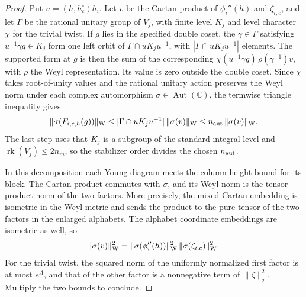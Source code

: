 \begin{proof}
Put $u=(h,h^\circ_c)h_i$. Let $v$ be the Cartan product of $\phi_i''(h)$ and $\zeta_{i,c}$, and let $\Gamma$ be the rational unitary group of $V_j$, with finite level $K_j$ and level character $\chi$ for the trivial twist. If $g$ lies in the specified double coset, the $\gamma\in\Gamma$ satisfying $u^{-1}\gamma g\in K_j$ form one left orbit of $\Gamma\cap u K_j u^{-1}$, with $|\Gamma\cap uK_j u^{-1}|$ elements. The supported form at $g$ is then the sum of the corresponding $\chi(u^{-1}\gamma g)\,\rho(\gamma^{-1})v$, with $\rho$ the Weyl representation. Its value is zero outside the double coset. Since $\chi$ takes root-of-unity values and the rational unitary action preserves the Weyl norm under each complex automorphism $\sigma\in\operatorname{Aut}(\mathbb C)$, the termwise triangle inequality gives
\[
 \|\sigma(F_{i,c,h}(g))\|_{\rm W}
 \le |\Gamma\cap uK_j u^{-1}|\,\|\sigma(v)\|_{\rm W}
 \le n_{\rm aut}\,\|\sigma(v)\|_{\rm W}.
\]
The last step uses that $K_j$ is a subgroup of the standard integral level and $\operatorname{rk}(V_j)\le2n_m$, so the stabilizer order divides the chosen $n_{\rm aut}$.

In this decomposition each Young diagram meets the column height bound for its block. The Cartan product commutes with $\sigma$, and its Weyl norm is the tensor product norm of the two factors. More precisely, the mixed Cartan embedding is isometric in the Weyl metric and sends the product to the pure tensor of the two factors in the enlarged alphabets. The alphabet coordinate embeddings are isometric as well, so
\[
 \|\sigma(v)\|_{\rm W}^2
 =\|\sigma(\phi_i''(h))\|_{\rm W}^2
  \,\|\sigma(\zeta_{i,c})\|_{\rm W}^2.
\]
For the trivial twist, the squared norm of the uniformly normalized first factor is at most $e^A$, and that of the other factor is a nonnegative term of $\|\zeta\|_\sigma^2$. Multiply the two bounds to conclude.
\end{proof}


